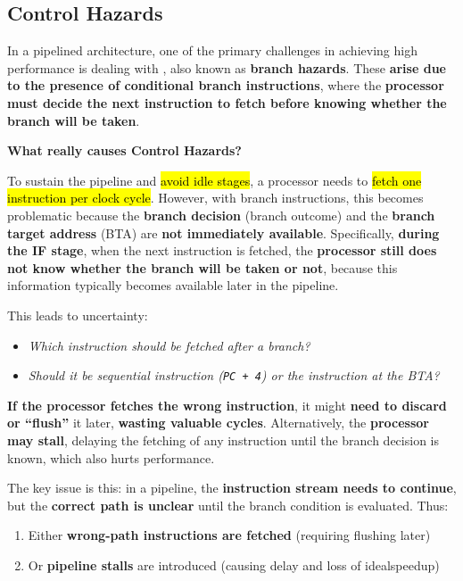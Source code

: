 \subsection{Control Hazards}

In a pipelined architecture, one of the primary challenges in achieving high performance is dealing with , also known as \textbf{branch hazards}. These \textbf{arise due to the presence of conditional branch instructions}, where the \textbf{processor must decide the next instruction to fetch before knowing whether the branch will be taken}.

\highspace
\begin{flushleft}
    \textcolor{Green3}{ \textbf{What really causes Control Hazards?}}
\end{flushleft}
To sustain the pipeline and \hl{avoid idle stages}, a processor needs to \hl{fetch one instruction per clock cycle}. However, with branch instructions, this becomes problematic because the \textbf{branch decision} (branch outcome) and the \textbf{branch target address} (BTA) are \textbf{not immediately available}. Specifically, \textbf{during the IF stage}, when the next instruction is fetched, the \textbf{processor still does not know whether the branch will be taken or not}, because this information typically becomes available later in the pipeline.

\highspace
This leads to uncertainty:
\begin{itemize}[label=\textcolor{Green3}{}]
    \item \emph{Which instruction should be fetched after a branch?}
    \item \emph{Should it be sequential instruction (\texttt{PC + 4}) or the instruction at the BTA?}
\end{itemize}
\textbf{If the processor fetches the wrong instruction}, it might \textbf{need to discard or ``flush''} it later, \textcolor{Red2}{\textbf{wasting valuable cycles}}. Alternatively, the \textcolor{Red2}{\textbf{processor may stall}}, delaying the fetching of any instruction until the branch decision is known, which also hurts performance.

\highspace
The key issue is this: in a pipeline, the \textbf{instruction stream needs to continue}, but the \textbf{correct path is unclear} until the branch condition is evaluated. Thus:
\begin{enumerate}
    \item Either \textbf{wrong-path instructions are fetched} (requiring flushing later)
    \item Or \textbf{pipeline stalls} are introduced (causing delay and loss of ideal\break speedup)
\end{enumerate}


